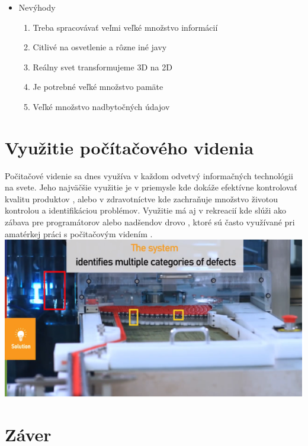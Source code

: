 \documentclass[10pt,twoside,slovak,a4paper]{coursepaper}
\begin{document}
\begin{itemize}
\item Nevýhody
	\begin{enumerate}
	\item Treba spracovávať veľmi veľké množstvo informácií
	\item Citlivé na osvetlenie a rôzne iné javy
	\item Reálny svet transformujeme 3D na 2D
	\item Je potrebné veľké množstvo pamäte
	\item Veľké množstvo nadbytočných údajov 
	\cite{CV-inspection-system}
	\end{enumerate}
\end{itemize}

\section{Využitie počítačového videnia}
Počitačové videnie sa dnes využíva v každom odvetvý informačných technológii na svete. Jeho najväčšie využitie je v priemysle kde dokáže efektívne kontrolovať kvalitu produktov , alebo v zdravotníctve kde zachraňuje množstvo životou kontrolou a identifikáciou problémov. Využitie má aj v rekreacií kde slúži ako zábava pre programátorov alebo nadšendov drovo , ktoré sú často využívané pri amatérkej práci s počitačovým videním . \cite{CV-inspection-system} 
\includegraphics[scale=0.75]{defect_detection.png}
\cite{inspection-in-manufacturing}
\section{Záver} \label{zaver} %






\end{document}

